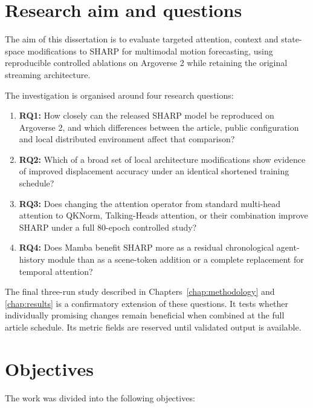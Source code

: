 \section{Research aim and questions}

The aim of this dissertation is to evaluate targeted attention, context and state-space modifications to SHARP for multimodal motion forecasting, using reproducible controlled ablations on Argoverse 2 while retaining the original streaming architecture.

The investigation is organised around four research questions:

\begin{enumerate}
    \item \textbf{RQ1:} How closely can the released SHARP model be reproduced on Argoverse 2, and which differences between the article, public configuration and local distributed environment affect that comparison?
    \item \textbf{RQ2:} Which of a broad set of local architecture modifications show evidence of improved displacement accuracy under an identical shortened training schedule?
    \item \textbf{RQ3:} Does changing the attention operator from standard multi-head attention to QKNorm, Talking-Heads attention, or their combination improve SHARP under a full 80-epoch controlled study?
    \item \textbf{RQ4:} Does Mamba benefit SHARP more as a residual chronological agent-history module than as a scene-token addition or a complete replacement for temporal attention?
\end{enumerate}

The final three-run study described in Chapters~\ref{chap:methodology} and \ref{chap:results} is a confirmatory extension of these questions. It tests whether individually promising changes remain beneficial when combined at the full article schedule. Its metric fields are reserved until validated output is available.

\section{Objectives}

The work was divided into the following objectives:

